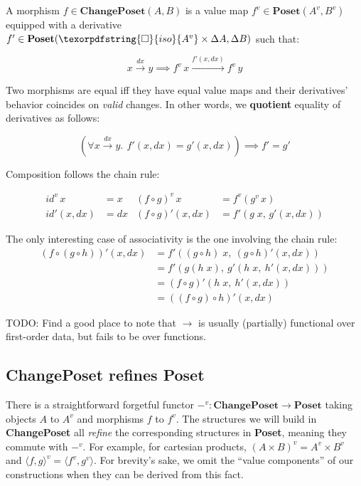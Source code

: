 \documentclass[nomarginums]{rntz}
\newcommand\todo[1]{{\color{Rhodamine}#1}}
\newcommand\cat\textbf
\newcommand\strong\textbf
\newcommand\CP{\cat{ChangePoset}}
\newcommand\Poset{\cat{Poset}}
\newcommand\D\Delta
\newcommand\x\times
\newcommand\iso{\texorpdfstring{\ensuremath{\square}}{iso}}
\newcommand\isof[1]{\iso {#1}}
\newcommand\fname[1]{\textit{#1}}
\newcommand\id{\fname{id}}
\newcommand\validarrow{{\to}}
\newcommand\longvalidarrow{{\longrightarrow}}
\newcommand\valid[1]{\mathrel{\overset{#1}{\validarrow}}}
\newcommand\longvalid[1]{\mathrel{\overset{#1}{\longvalidarrow}}}
\newcommand\vals[1]{#1^v} %
\newcommand\chgs[1]{\D{#1}}
\newcommand\fork[1]{\langle{#1}\rangle}
\newcommand\funct[1]{\vals{#1}}
\newcommand\deriv[1]{#1'}
\newcommand\bindsp{~\,}
\newcommand\fa[1]{\forall #1.\bindsp}
\begin{document}
\noindent
A morphism $f \in \CP(A, B)$ is a value map $\funct f \in \Poset(\vals A,
\vals B)$ equipped with a derivative $\deriv f \in \Poset(\isof{\vals A} \x
\chgs A, \chgs B)$ such that:

\[x \valid{dx} y \implies \funct f\,x \longvalid{\deriv f(x,dx)} \funct f\,y\]

\noindent
Two morphisms are equal iff they have equal value maps and their derivatives'
behavior coincides on \emph{valid} changes. In other words, we \strong{quotient}
equality of derivatives as follows:

\[ (\fa{x \valid{dx} y} f'(x,dx) = g'(x,dx)) \implies f' = g' \]

\noindent
Composition follows the chain rule:

\begin{align*}
  \funct\id\, x &= x &
  \funct{(f \circ g)}\, x &= \funct f (\funct g\,x)\\
  \deriv\id(x,dx) &= dx
  & \deriv{(f \circ g)} (x,dx) &= \deriv f (g \;x,\, \deriv g(x,dx))
\end{align*}

\noindent The only interesting case of associativity is the one involving the
chain rule:
\begin{align*}
  \deriv{(f \circ (g \circ h))} (x,dx)
  &= \deriv f((g \circ h) \;x,\ \deriv{(g \circ h)}(x,dx))\\
  &= \deriv f (g(h \;x),\ \deriv g(h \;x,\ \deriv h(x,dx)))\\
  &= \deriv{(f \circ g)} (h \;x,\ \deriv h(x,dx))\\
  &= \deriv{((f \circ g) \circ h)} (x,dx)
\end{align*}

\todo{TODO: Find a good place to note that $\validarrow$ is usually (partially)
  functional over first-order data, but fails to be over functions.}


\subsection{\CP{} refines \Poset{}}
\label{sec:refines}

There is a straightforward forgetful functor $\vals{-} : \CP \to \Poset$ taking
objects $A$ to $\vals{A}$ and morphisms $f$ to $\funct f$. The structures we
will build in \CP{} all \emph{refine} the corresponding structures in \Poset{},
meaning they commute with $\vals{-}$. For example, for cartesian products,
$\vals{(A \x B)} = \vals{A} \x \vals{B}$ and $\funct{\fork{f,g}} = \fork{\funct
  f, \funct g}$. For brevity's sake, we omit the ``value components'' of our
constructions when they can be derived from this fact.
\end{document}
